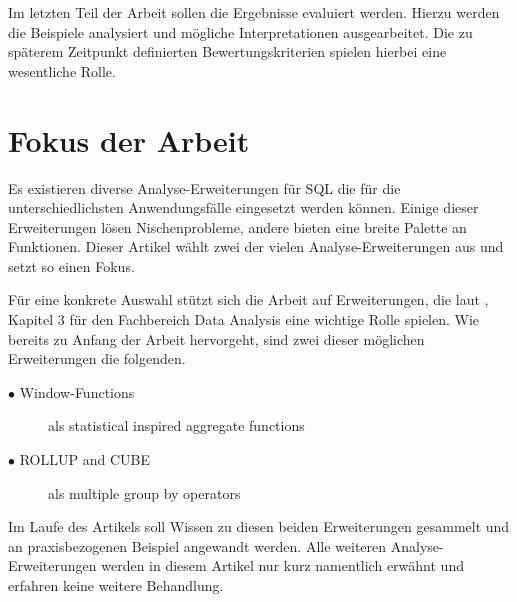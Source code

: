 Im letzten Teil der Arbeit sollen die Ergebnisse evaluiert werden. Hierzu werden
die Beispiele analysiert und mögliche Interpretationen ausgearbeitet. Die zu
späterem Zeitpunkt definierten Bewertungskriterien spielen hierbei eine
wesentliche Rolle.


\section{Fokus der Arbeit}
\label{sec:fokus_der_arbeit} Es existieren diverse Analyse-Erweiterungen für SQL
die für die unterschiedlichsten Anwendungsfälle eingesetzt werden können. Einige
dieser Erweiterungen lösen Nischenprobleme, andere bieten eine breite Palette an
Funktionen. Dieser Artikel wählt zwei der vielen Analyse-Erweiterungen aus und
setzt so einen Fokus.

Für eine konkrete Auswahl stützt sich die Arbeit auf Erweiterungen, die laut \citet{FOTACHE2015243},
Kapitel 3 für den Fachbereich Data Analysis eine wichtige Rolle spielen. Wie
bereits zu Anfang der Arbeit hervorgeht, sind zwei dieser möglichen Erweiterungen
die folgenden.

\begin{description}
	\item[$\bullet$ Window-Functions] als statistical inspired aggregate functions
		\\ \citep[Kapitel 4.3]{FOTACHE2015243}

	\item[$\bullet$ ROLLUP and CUBE] als multiple group by operators \\ \citep[Kapitel4.3]{FOTACHE2015243}
\end{description}

Im Laufe des Artikels soll Wissen zu diesen beiden Erweiterungen gesammelt und
an praxisbezogenen Beispiel angewandt werden. Alle weiteren Analyse-Erweiterungen
werden in diesem Artikel nur kurz namentlich erwähnt und erfahren keine weitere Behandlung.